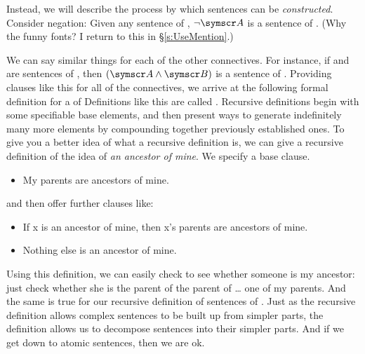 Instead, we will describe the process by which sentences can be \emph{constructed}. Consider negation: Given any sentence  of \TFL, $\enot\meta{A}$ is a sentence of \TFL. (Why the funny fonts? I return to this in §\ref{s:UseMention}.)

We can say similar things for each of the other connectives. For instance, if  and  are sentences of \TFL, then $(\meta{A}\eand\meta{B})$ is a sentence of \TFL. Providing clauses like this for all of the connectives, we arrive at the following formal definition for a  of \TFL\:
Definitions like this are called . Recursive definitions begin with some specifiable base elements, and then present ways to generate indefinitely many more elements by compounding together previously established ones. To give you a better idea of what a recursive definition is, we can give a recursive definition of the idea of \emph{an ancestor of mine}. We specify a base clause.
	\begin{itemize}
		\item My parents are ancestors of mine.
	\end{itemize}
and then offer further clauses like:
	\begin{itemize}
		\item If x is an ancestor of mine, then x's parents are ancestors of mine.
		\item Nothing else is an ancestor of mine.
	\end{itemize}
Using this definition, we can easily check to see whether someone is my ancestor: just check whether she is the parent of the parent of … one of my parents. And the same is true for our recursive definition of sentences of \TFL. Just as the recursive definition allows complex sentences to be built up from simpler parts, the definition allows us to decompose sentences into their simpler parts. And if we get down to atomic sentences, then we are ok. 

